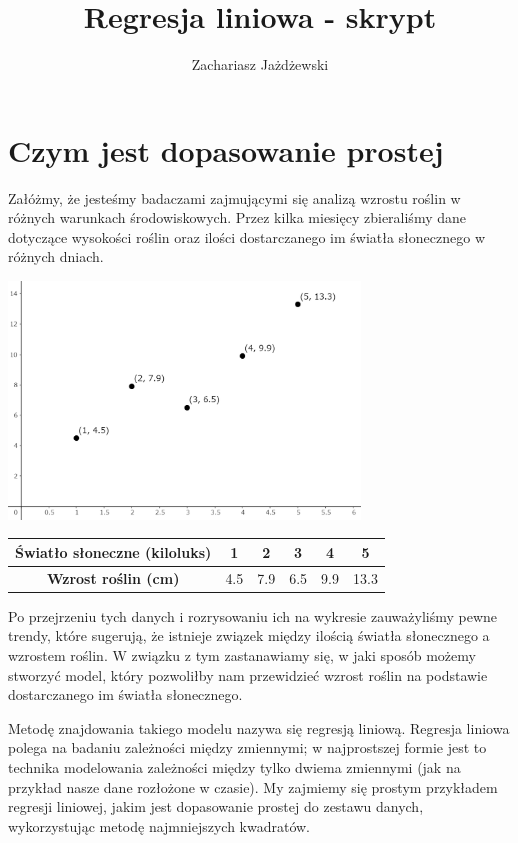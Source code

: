 \documentclass[a4paper,12pt]{article}
\title{Regresja liniowa - skrypt}
\author{Zachariasz Jażdżewski}
\begin{document}
\maketitle


\section{Czym jest dopasowanie prostej}
Załóżmy, że jesteśmy badaczami zajmującymi się analizą wzrostu roślin w różnych warunkach środowiskowych. Przez kilka miesięcy zbieraliśmy dane dotyczące wysokości roślin oraz ilości dostarczanego im światła słonecznego w różnych dniach. 

\begin{center}
	\includegraphics[width=0.7\textwidth]{Figures/figure-1.png}
\end{center}

\begin{table}[h]
    \centering
    \begin{tabular}{|c|c|c|c|c|c|}
        \hline
        \textbf{Światło słoneczne (kiloluks)} & 1 & 2 & 3 & 4 & 5 \\
		\hline
        \textbf{Wzrost roślin (cm)} & 4.5 & 7.9 & 6.5 & 9.9 & 13.3 \\
        \hline
    \end{tabular}
\end{table}

Po przejrzeniu tych danych i rozrysowaniu ich na wykresie zauważyliśmy pewne trendy, które sugerują, że istnieje związek między ilością światła słonecznego a wzrostem roślin. W związku z tym zastanawiamy się, w jaki sposób możemy stworzyć model, który pozwoliłby nam przewidzieć wzrost roślin na podstawie dostarczanego im światła słonecznego.

Metodę znajdowania takiego modelu nazywa się regresją liniową. Regresja liniowa polega na badaniu zależności między zmiennymi; w najprostszej formie jest to technika modelowania zależności między tylko dwiema zmiennymi (jak na przykład nasze dane rozłożone w czasie). My zajmiemy się prostym przykładem regresji liniowej, jakim jest dopasowanie prostej do zestawu danych, wykorzystując metodę najmniejszych kwadratów.
\end{document}
